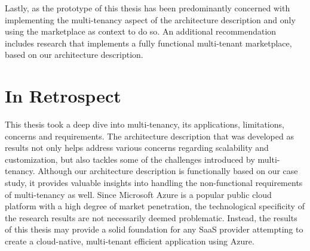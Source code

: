 Lastly, as the prototype of this thesis has been predominantly concerned with implementing the multi-tenancy aspect of the architecture description and only using the marketplace as context to do so. An additional recommendation includes research that implements a fully functional multi-tenant marketplace, based on our architecture description. 


\section{In Retrospect}
This thesis took a deep dive into multi-tenancy, its applications, limitations, concerns and requirements. The architecture description that was developed as results not only helps address various concerns regarding scalability and customization, but also tackles some of the challenges introduced by multi-tenancy. Although our architecture description is functionally based on our case study, it provides valuable insights into handling the non-functional requirements of multi-tenancy as well. 
Since Microsoft Azure is a popular public cloud platform with a high degree of market penetration, the technological specificity of the research results are not necessarily deemed problematic. Instead, the results of this thesis may provide a solid foundation for any SaaS provider attempting to create a cloud-native, multi-tenant efficient application using Azure.